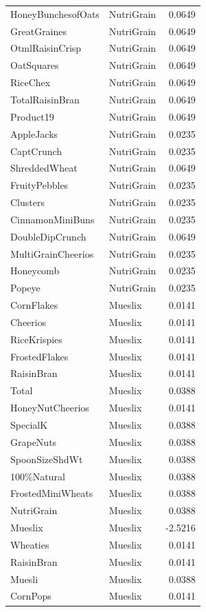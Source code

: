 \begin{longtable}{llr}
HoneyBunchesofOats & NutriGrain & 0.0649 \\
GreatGraines & NutriGrain & 0.0649 \\
OtmlRaisinCrisp & NutriGrain & 0.0649 \\
OatSquares & NutriGrain & 0.0649 \\
RiceChex & NutriGrain & 0.0649 \\
TotalRaisinBran & NutriGrain & 0.0649 \\
Product19 & NutriGrain & 0.0649 \\
AppleJacks & NutriGrain & 0.0235 \\
CaptCrunch & NutriGrain & 0.0235 \\
ShreddedWheat & NutriGrain & 0.0649 \\
FruityPebbles & NutriGrain & 0.0235 \\
Clusters & NutriGrain & 0.0235 \\
CinnamonMiniBuns & NutriGrain & 0.0235 \\
DoubleDipCrunch & NutriGrain & 0.0649 \\
MultiGrainCheerios & NutriGrain & 0.0235 \\
Honeycomb & NutriGrain & 0.0235 \\
Popeye & NutriGrain & 0.0235 \\
CornFlakes & Mueslix & 0.0141 \\
Cheerios & Mueslix & 0.0141 \\
RiceKrispies & Mueslix & 0.0141 \\
FrostedFlakes & Mueslix & 0.0141 \\
RaisinBran & Mueslix & 0.0141 \\
Total & Mueslix & 0.0388 \\
HoneyNutCheerios & Mueslix & 0.0141 \\
SpecialK & Mueslix & 0.0388 \\
GrapeNuts & Mueslix & 0.0388 \\
SpoonSizeShdWt & Mueslix & 0.0388 \\
100\%Natural & Mueslix & 0.0388 \\
FrostedMiniWheats & Mueslix & 0.0388 \\
NutriGrain & Mueslix & 0.0388 \\
Mueslix & Mueslix & -2.5216 \\
Wheaties & Mueslix & 0.0141 \\
RaisinBran & Mueslix & 0.0141 \\
Muesli & Mueslix & 0.0388 \\
CornPops & Mueslix & 0.0141 \\

\end{longtable}
